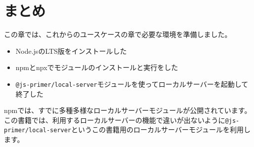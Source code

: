 \hypertarget{conslusion}{%
\section{まとめ}\label{conslusion}}

この章では、これからのユースケースの章で必要な環境を準備しました。

\begin{itemize}
\item
  Node.jsのLTS版をインストールした
\item
  npmとnpxでモジュールのインストールと実行をした
\item
  \texttt{@js-primer/local-server}モジュールを使ってローカルサーバーを起動して終了した
\end{itemize}

npmでは、すでに多種多様なローカルサーバーモジュールが公開されています。
この書籍では、利用するローカルサーバーの機能で違いが出ないように\texttt{@js-primer/local-server}というこの書籍用のローカルサーバーモジュールを利用します。
